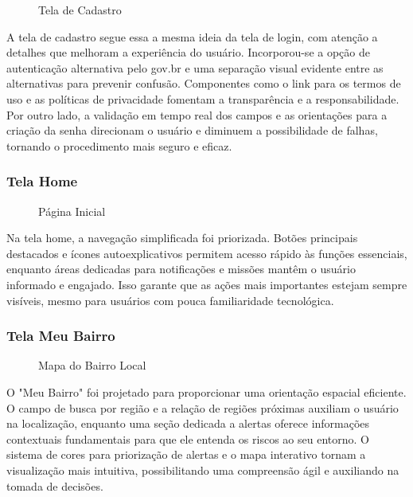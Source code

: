 \documentclass[a4paper, 12pt]{article}
\begin{document}
\begin{figure}[H]
  \centering
  \caption{Tela de Cadastro}
  \label{fig:cadastro}
\end{figure}

A tela de cadastro segue essa a mesma ideia da tela de login, com atenção a detalhes que melhoram a experiência do usuário. Incorporou-se a opção de autenticação alternativa pelo gov.br e uma separação visual evidente entre as alternativas para prevenir confusão.  Componentes como o link para os termos de uso e as políticas de privacidade fomentam a transparência e a responsabilidade. Por outro lado, a validação em tempo real dos campos e as orientações para a criação da senha direcionam o usuário e diminuem a possibilidade de falhas, tornando o procedimento mais seguro e eficaz.

\subsubsection{Tela Home}

\begin{figure}[H]
  \centering
  \caption{Página Inicial}
  \label{fig:home}
\end{figure}

Na tela home, a navegação simplificada foi priorizada. Botões principais destacados e ícones autoexplicativos permitem acesso rápido às funções essenciais, enquanto áreas dedicadas para notificações e missões mantêm o usuário informado e engajado. Isso garante que as ações mais importantes estejam sempre visíveis, mesmo para usuários com pouca familiaridade tecnológica.

\subsubsection{Tela Meu Bairro}

\begin{figure}[H]
  \centering
  \caption{Mapa do Bairro Local}
  \label{fig:bairro}
\end{figure}

O "Meu Bairro" foi projetado para proporcionar uma orientação espacial eficiente.  O campo de busca por região e a relação de regiões próximas auxiliam o usuário na localização, enquanto uma seção dedicada a alertas oferece informações contextuais fundamentais para que ele entenda os riscos ao seu entorno.  O sistema de cores para priorização de alertas e o mapa interativo tornam a visualização mais intuitiva, possibilitando uma compreensão ágil e auxiliando na tomada de decisões.
\end{document}
